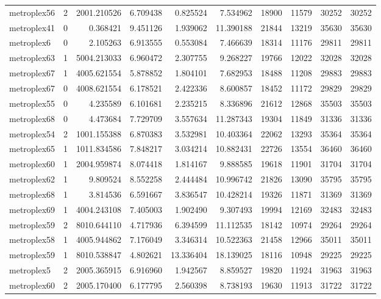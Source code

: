 \begin{longtable}{|l|r|r|r|r|r|r|r|r|r|}
metroplex56 & 2 & 2001.210526 & 6.709438 & 0.825524 & 7.534962 & 18900 & 11579 & 30252 & 30252 \\
metroplex41 & 0 & 0.368421 & 9.451126 & 1.939062 & 11.390188 & 21844 & 13219 & 35630 & 35630 \\
metroplex6 & 0 & 2.105263 & 6.913555 & 0.553084 & 7.466639 & 18314 & 11176 & 29811 & 29811 \\
metroplex63 & 1 & 5004.213033 & 6.960472 & 2.307755 & 9.268227 & 19766 & 12022 & 32028 & 32028 \\
metroplex67 & 1 & 4005.621554 & 5.878852 & 1.804101 & 7.682953 & 18488 & 11208 & 29883 & 29883 \\
metroplex67 & 0 & 4008.621554 & 6.178521 & 2.422336 & 8.600857 & 18452 & 11172 & 29829 & 29829 \\
metroplex55 & 0 & 4.235589 & 6.101681 & 2.235215 & 8.336896 & 21612 & 12868 & 35503 & 35503 \\
metroplex68 & 0 & 4.473684 & 7.729709 & 3.557634 & 11.287343 & 19304 & 11849 & 31336 & 31336 \\
metroplex54 & 2 & 1001.155388 & 6.870383 & 3.532981 & 10.403364 & 22062 & 13293 & 35364 & 35364 \\
metroplex65 & 1 & 1011.834586 & 7.848217 & 3.034214 & 10.882431 & 22726 & 13554 & 36460 & 36460 \\
metroplex60 & 1 & 2004.959874 & 8.074418 & 1.814167 & 9.888585 & 19618 & 11901 & 31704 & 31704 \\
metroplex62 & 1 & 9.809524 & 8.552258 & 2.444484 & 10.996742 & 21826 & 13090 & 35795 & 35795 \\
metroplex68 & 1 & 3.814536 & 6.591667 & 3.836547 & 10.428214 & 19326 & 11871 & 31369 & 31369 \\
metroplex69 & 1 & 4004.243108 & 7.405003 & 1.902490 & 9.307493 & 19994 & 12169 & 32483 & 32483 \\
metroplex59 & 2 & 8010.644110 & 4.717936 & 6.394599 & 11.112535 & 18142 & 10974 & 29264 & 29264 \\
metroplex58 & 1 & 4005.944862 & 7.176049 & 3.346314 & 10.522363 & 21458 & 12966 & 35011 & 35011 \\
metroplex59 & 1 & 8010.538847 & 4.802621 & 13.336404 & 18.139025 & 18116 & 10948 & 29225 & 29225 \\
metroplex5 & 2 & 2005.365915 & 6.916960 & 1.942567 & 8.859527 & 19820 & 11924 & 31963 & 31963 \\
metroplex60 & 2 & 2005.170400 & 6.177795 & 2.560398 & 8.738193 & 19630 & 11913 & 31722 & 31722 \\

\end{longtable}

